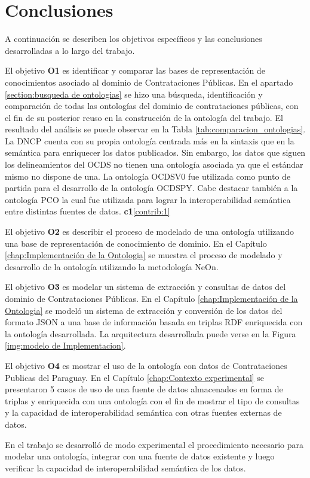 \section{Conclusiones}
\label{chap:analisis}
A continuación se describen los objetivos específicos y las conclusiones desarrolladas a lo largo del trabajo.  

El objetivo \textbf{O1} es identificar y comparar las bases de representación de conocimientos asociado al dominio de Contrataciones Públicas. En el apartado \ref{section:busqueda de ontologias} se hizo una búsqueda, identificación y comparación de todas las ontologías del dominio de contrataciones públicas, con el fin de su posterior reuso en la construcción de la ontología del trabajo. El resultado del análisis se puede observar en la Tabla \ref{tab:comparacion_ontologias}. La DNCP cuenta con su propia ontología centrada más en la sintaxis que en la semántica para enriquecer los datos publicados. Sin embargo, los datos que siguen los delineamientos del OCDS no tienen una ontología asociada ya que el estándar mismo no dispone de una. La ontología OCDSV0 fue utilizada como punto de partida para el desarrollo de la ontología OCDSPY. Cabe destacar también a la ontología PCO la cual fue utilizada para lograr la interoperabilidad semántica entre distintas fuentes de datos. \textbf{c1}\ref{contrib:1}

El objetivo \textbf{O2} es describir el proceso de modelado de una ontología utilizando una base de representación de conocimiento de dominio. En el Capítulo \ref{chap:Implementación de la Ontologia} se muestra el proceso de modelado y desarrollo de la ontología utilizando la metodología NeOn.

El objetivo \textbf{O3} es modelar un sistema de extracción y consultas de datos del dominio de Contrataciones Públicas. En el Capítulo \ref{chap:Implementación de la Ontologia} se modeló un sistema de extracción y conversión de los datos del formato JSON a una base de información basada en triplas RDF enriquecida con la ontología desarrollada. La arquitectura desarrollada puede verse en la Figura \ref{img:modelo de Implementacion}.

El objetivo \textbf{O4} es mostrar el uso de la ontología con datos de Contrataciones Publicas del Paraguay. En el Capítulo \ref{chap:Contexto experimental} se presentaron 5 casos de uso de una fuente de datos almacenados en forma de triplas y enriquecida con una ontología con el fin de mostrar el tipo de consultas y la capacidad de interoperabilidad semántica con otras fuentes externas de datos. 

En el trabajo se desarrolló de modo experimental el procedimiento necesario para modelar una ontología, integrar con una fuente de datos existente y luego verificar la capacidad de interoperabilidad semántica de los datos. 